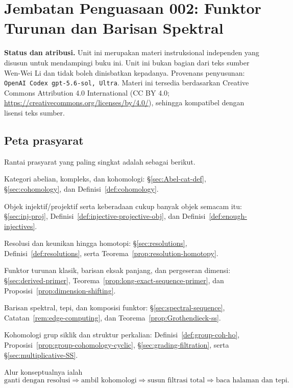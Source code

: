 
\section*{Jembatan Penguasaan 002: Funktor Turunan dan Barisan Spektral}
\hypertarget{o014.mastery.derived-spectral.002}{ }
\label{mastery:derived-spectral-002}

\noindent\textbf{Status dan atribusi.}
Unit ini merupakan materi instruksional independen yang disusun untuk
mendampingi buku ini. Unit ini bukan bagian dari teks sumber Wen-Wei Li dan
tidak boleh dinisbatkan kepadanya. Provenans penyusunan:
\texttt{OpenAI Codex gpt-5.6-sol, Ultra}. Materi ini tersedia berdasarkan
Creative Commons Attribution 4.0 International
(CC BY 4.0; \url{https://creativecommons.org/licenses/by/4.0/}), sehingga
kompatibel dengan lisensi teks sumber.

\subsection*{Peta prasyarat}

Rantai prasyarat yang paling singkat adalah sebagai berikut.
\begin{compactitem}
	\item Kategori abelian, kompleks, dan kohomologi:
	\S\ref{sec:Abel-cat-def}, \S\ref{sec:cohomology}, dan
	Definisi~\ref{def:cohomology}.
	\item Objek injektif/projektif serta keberadaan cukup banyak objek semacam itu:
	\S\ref{sec:inj-proj}, Definisi~\ref{def:injective-projective-obj}, dan
	Definisi~\ref{def:enough-injectives}.
	\item Resolusi dan keunikan hingga homotopi:
	\S\ref{sec:resolutions}, Definisi~\ref{def:resolutions}, serta
	Teorema~\ref{prop:resolution-homotopy}.
	\item Funktor turunan klasik, barisan eksak panjang, dan pergeseran
	dimensi: \S\ref{sec:derived-primer},
	Teorema~\ref{prop:long-exact-sequence-primer}, dan
	Proposisi~\ref{prop:dimension-shifting}.
	\item Barisan spektral, tepi, dan komposisi funktor:
	\S\ref{sec:spectral-sequence}, Catatan~\ref{rem:edge-computing}, dan
	Teorema~\ref{prop:Grothendieck-ss}.
	\item Kohomologi grup siklik dan struktur perkalian:
	Definisi~\ref{def:group-coh-ho},
	Proposisi~\ref{prop:group-cohomology-cyclic},
	\S\ref{sec:grading-filtration}, serta
	\S\ref{sec:multiplicative-SS}.
\end{compactitem}
Alur konseptualnya ialah
\[
	\text{ganti dengan resolusi}
	\Longrightarrow \text{ambil kohomologi}
	\Longrightarrow \text{susun filtrasi total}
	\Longrightarrow \text{baca halaman dan tepi}.
\]


